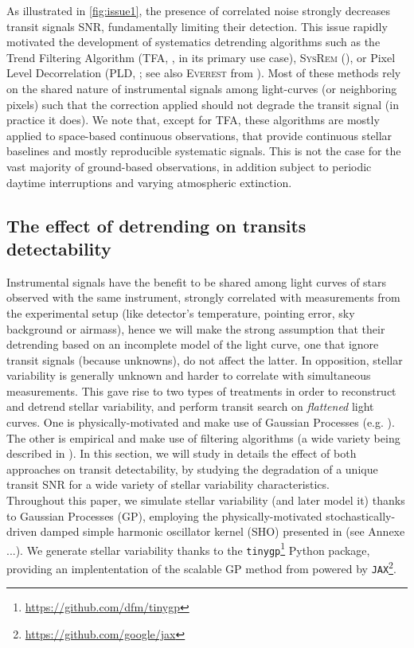 \documentclass{aastex631}
\begin{document}
As illustrated in \autoref{fig:issue1}, the presence of correlated noise strongly decreases transit signals SNR, fundamentally limiting their detection. This issue rapidly motivated the development of systematics detrending algorithms such as the Trend Filtering Algorithm (\textsc{TFA}, \citealt{tfa}, in its primary use case), \textsc{SysRem} (\citealt{sysrem}), or Pixel Level Decorrelation (\textsc{PLD}, \citealt{pld}; see also \textsc{Everest} from \citealt{everest1, everest2}). Most of these methods rely on the shared nature of instrumental signals among light-curves (or neighboring pixels) such that the correction applied should not degrade the transit signal (in practice it does). We note that, except for \textsc{TFA}, these algorithms are mostly applied to space-based continuous observations, that provide continuous stellar baselines and mostly reproducible systematic signals. This is not the case for the vast majority of ground-based observations, in addition subject to periodic daytime interruptions and varying atmospheric extinction.

\subsection{The effect of detrending on transits detectability}

Instrumental signals have the benefit to be shared among light curves of stars observed with the same instrument, strongly correlated with measurements from the experimental setup (like detector's temperature, pointing error, sky background or airmass), hence we will make the strong assumption that their detrending based on an incomplete model of the light curve, one that ignore transit signals (because unknowns), do not affect the latter. In opposition, stellar variability is generally unknown and harder to correlate with simultaneous measurements. This gave rise to two types of treatments in order to reconstruct and detrend stellar variability, and perform transit search on \textit{flattened} light curves. One is physically-motivated and make use of Gaussian Processes (e.g. \cite{k2sc}). The other is empirical and make use of filtering algorithms (a wide variety being described in \cite{wotan}). In this section, we will study in details the effect of both approaches on transit detectability, by studying the degradation of a unique transit SNR for a wide variety of stellar variability characteristics.
\bigskip\\
Throughout this paper, we simulate stellar variability (and later model it) thanks to Gaussian Processes (GP), employing the physically-motivated stochastically-driven damped simple harmonic oscillator kernel (SHO) presented in \citealt{celerite1} (see Annexe ...). We generate stellar variability thanks to the \texttt{tinygp}\footnote{\href{https://github.com/dfm/tinygp}{https://github.com/dfm/tinygp}} Python package, providing an implententation of the scalable GP method from \citealt{celerite2} powered by \texttt{JAX}\footnote{\href{https://github.com/google/jax}{https://github.com/google/jax}}.
\end{document}

